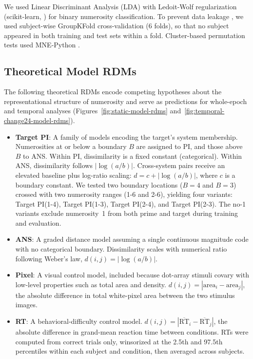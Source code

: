 We used Linear Discriminant Analysis (LDA) with Ledoit-Wolf
regularization (scikit-learn, \citealp{Pedregosa2011}) for binary
numerosity classification. To prevent data leakage
\citep{KapoorNarayanan2023Leakage}, we used subject-wise GroupKFold
cross-validation (6 folds), so that no subject appeared in both
training and test sets within a fold. Cluster-based permutation tests
used MNE-Python \citep{Gramfort2013}.

\subsection{Theoretical Model RDMs}
The following theoretical RDMs encode competing hypotheses about the
representational structure of numerosity and serve as predictions
for whole-epoch and temporal analyses
(Figures~\ref{fig:static-model-rdms} and~\ref{fig:temporal-change24-model-rdms}).
\begin{itemize}
  \item \textbf{Target PI}: A family of models encoding the target's
    system membership. Numerosities at
    or below a boundary $B$ are assigned to PI, and those above $B$ to
    ANS. Within PI, dissimilarity is a fixed constant (categorical).
    Within ANS, dissimilarity follows $|\log(a/b)|$. Cross-system
    pairs receive an elevated baseline plus log-ratio scaling:
    $d = c + |\log(a/b)|$, where $c$ is a boundary constant. We
    tested two boundary locations ($B = 4$ and $B = 3$) crossed with
    two numerosity ranges (1-6 and 2-6), yielding four variants:
    Target PI(1-4), Target PI(1-3), Target PI(2-4), and Target
    PI(2-3). The no-1 variants exclude numerosity~1 from both prime
    and target during training and evaluation.
  \item \textbf{ANS}: A graded distance model assuming a single
    continuous magnitude code with no categorical boundary.
    Dissimilarity scales with numerical ratio following Weber's law,
    $d(i,j) = |\log(a/b)|$.
  \item \textbf{Pixel}: A visual control model, included because
    dot-array stimuli covary with low-level properties such as total
    area and density.
    $d(i,j) = |\text{area}_i - \text{area}_j|$,
    the absolute difference in total white-pixel area between the two
    stimulus images.
  \item \textbf{RT}: A behavioral-difficulty control model.
    $d(i,j) = |\overline{\text{RT}}_i -
    \overline{\text{RT}}_j|$, the absolute difference in grand-mean
    reaction time between conditions. RTs were computed from correct
    trials only, winsorized at the 2.5th and 97.5th percentiles within
    each subject and condition, then averaged across subjects.
\end{itemize}


